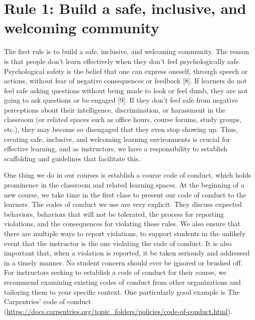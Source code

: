 \documentclass[
  10pt,
  letterpaper,
]{article}
\begin{document}
\section{Rule 1: Build a safe, inclusive, and welcoming
community}\label{sec-rule1}

The first rule is to build a safe, inclusive, and welcoming community.
The reason is that people don't learn effectively when they don't feel
psychologically safe. Psychological safety is the belief that one can
express oneself, through speech or actions, without fear of negative
consequences or feedback {[}8{]}. If learners do not feel safe asking
questions without being made to look or feel dumb, they are not going to
ask questions or be engaged {[}9{]}. If they don't feel safe from
negative perceptions about their intelligence, discrimination, or
harassment in the classroom (or related spaces such as office hours,
course forums, study groups, etc.), they may become so disengaged that
they even stop showing up. Thus, creating safe, inclusive, and welcoming
learning environments is crucial for effective learning, and as
instructors, we have a responsibility to establish scaffolding and
guidelines that facilitate this.

One thing we do in our courses is establish a course code of conduct,
which holds prominence in the classroom and related learning spaces. At
the beginning of a new course, we take time in the first class to
present our code of conduct to the learners. The codes of conduct we use
are very explicit. They discuss expected behaviors, behaviors that will
not be tolerated, the process for reporting violations, and the
consequences for violating these rules. We also ensure that there are
multiple ways to report violations, to support students in the unlikely
event that the instructor is the one violating the code of conduct. It
is also important that, when a violation is reported, it be taken
seriously and addressed in a timely manner. No student concern should
ever be ignored or brushed off. For instructors seeking to establish a
code of conduct for their course, we recommend examining existing codes
of conduct from other organizations and tailoring them to your specific
context. One particularly good example is The Carpentries' code of
conduct
(\url{https://docs.carpentries.org/topic_folders/policies/code-of-conduct.html}).
\end{document}
